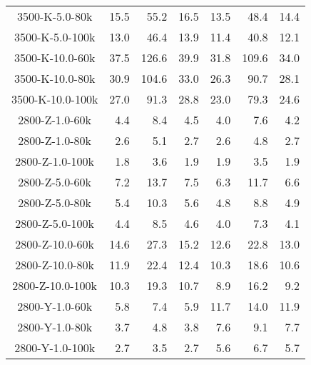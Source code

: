 \begin{longtable}{crrrrrr}
      3500-K-5.0-80k &        15.5 &        55.2 &        16.5 &           13.5 &           48.4 &           14.4 \\
      3500-K-5.0-100k &        13.0 &        46.4 &        13.9 &           11.4 &           40.8 &           12.1 \\
      3500-K-10.0-60k &        37.5 &       126.6 &        39.9 &           31.8 &          109.6 &           34.0 \\
      3500-K-10.0-80k &        30.9 &       104.6 &        33.0 &           26.3 &           90.7 &           28.1 \\
      3500-K-10.0-100k &        27.0 &        91.3 &        28.8 &           23.0 &           79.3 &           24.6 \\
      2800-Z-1.0-60k &         4.4 &         8.4 &         4.5 &            4.0 &            7.6 &            4.2 \\
      2800-Z-1.0-80k &         2.6 &         5.1 &         2.7 &            2.6 &            4.8 &            2.7 \\
      2800-Z-1.0-100k &         1.8 &         3.6 &         1.9 &            1.9 &            3.5 &            1.9 \\
      2800-Z-5.0-60k &         7.2 &        13.7 &         7.5 &            6.3 &           11.7 &            6.6 \\
      2800-Z-5.0-80k &         5.4 &        10.3 &         5.6 &            4.8 &            8.8 &            4.9 \\
      2800-Z-5.0-100k &         4.4 &         8.5 &         4.6 &            4.0 &            7.3 &            4.1 \\
      2800-Z-10.0-60k &        14.6 &        27.3 &        15.2 &           12.6 &           22.8 &           13.0 \\
      2800-Z-10.0-80k &        11.9 &        22.4 &        12.4 &           10.3 &           18.6 &           10.6 \\
      2800-Z-10.0-100k &        10.3 &        19.3 &        10.7 &            8.9 &           16.2 &            9.2 \\
      2800-Y-1.0-60k &         5.8 &         7.4 &         5.9 &           11.7 &           14.0 &           11.9 \\
      2800-Y-1.0-80k &         3.7 &         4.8 &         3.8 &            7.6 &            9.1 &            7.7 \\
      2800-Y-1.0-100k &         2.7 &         3.5 &         2.7 &            5.6 &            6.7 &            5.7 \\

\end{longtable}

